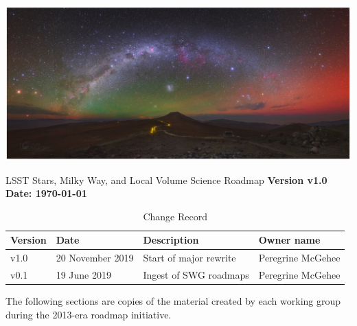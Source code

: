 \documentclass[12pt]{article}
\begin{document}
\begin{center}
\includegraphics[width=1.0\textwidth]{milkyway.jpg}
\vspace{1.0in}

\huge
LSST Stars, Milky Way, and Local Volume Science Roadmap
\linebreak
\linebreak
\normalsize
{\bf Version v1.0}
\linebreak
{\bf Date: \today}
\end{center}

\pagebreak

\begin{table}[h]
\caption{Change Record}
\begin{center}
\label{tab:changerecord}
\begin{tabular}{|l|l|l|l|}
\hline 
\textbf{Version} & \textbf{Date} & \textbf{Description} & \textbf{Owner name} \\
\hline 
v1.0 & 20 November 2019 & Start of major rewrite & Peregrine McGehee \\
v0.1 & 19 June 2019 & Ingest of SWG roadmaps & Peregrine McGehee \\
\hline 
\end{tabular}
\end{center}
\end{table}

\pagebreak


\tableofcontents

\pagebreak












The following sections are copies of the material created by each working group during the 2013-era 
roadmap initiative.












\end{document}
